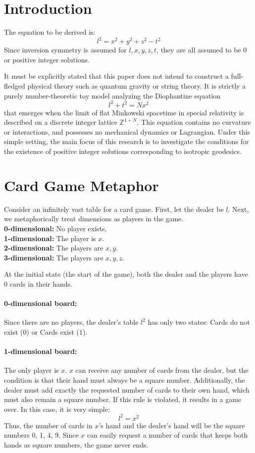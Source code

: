 \documentclass[11pt,a4paper]{article}
\begin{document}
\section{Introduction}
The equation to be derived is:
\[ l^2 = x^2 + y^2 + z^2 - t^2 \]
Since inversion symmetry is assumed for \( l, x, y, z, t \), they are all assumed to be 0 or positive integer solutions.

It must be explicitly stated that this paper does not intend to construct a full-fledged physical theory such as quantum gravity or string theory. It is strictly a purely number-theoretic toy model analyzing the Diophantine equation
\[ l^2 + t^2 = N x^2 \]
that emerges when the limit of flat Minkowski spacetime in special relativity is described on a discrete integer lattice $ \mathbb{Z}^{1+N} $. This equation contains no curvature or interactions, and possesses no mechanical dynamics or Lagrangian. Under this simple setting, the main focus of this research is to investigate the conditions for the existence of positive integer solutions corresponding to isotropic geodesics.

\section{Card Game Metaphor}
Consider an infinitely vast table for a card game. First, let the dealer be \( l \).
Next, we metaphorically treat dimensions as players in the game. \\
\textbf{0-dimensional:} No player exists. \\
\textbf{1-dimensional:} The player is \( x \). \\
\textbf{2-dimensional:} The players are \( x, y \). \\
\textbf{3-dimensional:} The players are \( x, y, z \).

At the initial state (the start of the game), both the dealer and the players have 0 cards in their hands.

\paragraph{0-dimensional board:}
Since there are no players, the dealer's table \( l^2 \) has only two states: Cards do not exist ($0$) or Cards exist ($1$).

\paragraph{1-dimensional board:}
The only player is \( x \). \( x \) can receive any number of cards from the dealer, but the condition is that their hand must always be a square number. Additionally, the dealer must add exactly the requested number of cards to their own hand, which must also remain a square number. If this rule is violated, it results in a game over.
In this case, it is very simple:
\[ l^2 = x^2 \]
Thus, the number of cards in \( x \)'s hand and the dealer's hand will be the square numbers 0, 1, 4, 9. Since \( x \) can easily request a number of cards that keeps both hands as square numbers, the game never ends.
\end{document}

